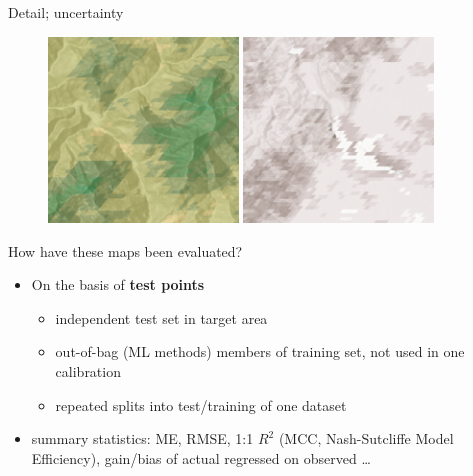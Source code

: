 \documentclass[aspectratio=169]{beamer}
\begin{document}
\begin{frame}{Detail; uncertainty}
\begin{figure}
\includegraphics[width=0.45\textwidth]{./graphics_david/SoilGridsDetail.png}
\hfill
\includegraphics[width=0.45\textwidth]{./graphics_david/SoilGridsUncertainty.png}
\end{figure}
\end{frame}

\begin{frame}{How have these maps been evaluated?}
    \begin{itemize}
        \item On the basis of \textbf{test points}
        \begin{itemize}
            \item independent test set in target area
            \item out-of-bag (ML methods) members of training set, not used in one calibration
            \item repeated splits into test/training of one dataset
        \end{itemize}
        \item summary statistics: ME, RMSE, 1:1 $R^2$ (MCC, Nash-Sutcliffe Model Efficiency), gain/bias of actual regressed on observed \ldots
    \end{itemize}
\end{frame}
\end{document}
